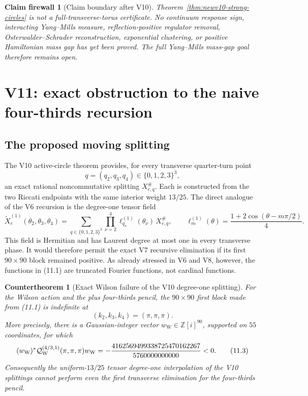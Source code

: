 \documentclass[11pt,oneside]{article}
\newtheorem{firewall}[theorem]{Claim firewall}
\newtheorem{countertheorem}[theorem]{Countertheorem}
\theoremstyle{definition}
\theoremstyle{remark}
\begin{document}
\begin{firewall}[Claim boundary after V10]
\label{fire:newv10-final}
Theorem~\ref{thm:newv10-strong-circles} is not a full-transverse-torus
certificate.  No continuum response sign, interacting Yang--Mills
measure, reflection-positive regulator removal, Osterwalder--Schrader
reconstruction, exponential clustering, or positive Hamiltonian
mass gap has yet been proved.  The full Yang--Mills mass-gap goal
therefore remains open.
\end{firewall}

\section{V11: exact obstruction to the naive four-thirds recursion}
\label{sec:newv11-obstruction}

\subsection{The proposed moving splitting}

The V10 active-circle theorem provides, for every transverse
quarter-turn point
\[
 q=(q_2,q_3,q_4)\in\{0,1,2,3\}^3,
\]
an exact rational noncommutative splitting \(X_{e,q}^{\#}\).  Each is
constructed from the two Riccati endpoints with the same interior
weight \(13/25\).  The direct analogue of the V6 recursion is the
degree-one tensor field
\[
 \widetilde X_e^{(1)}(\theta_2,\theta_3,\theta_4)
 =
 \sum_{q\in\{0,1,2,3\}^3}
 \prod_{\nu=2}^4
 \ell_{q_\nu}^{(1)}(\theta_\nu)\,X_{e,q}^{\#},
 \qquad
 \ell_m^{(1)}(\theta)
 =\frac{1+2\cos(\theta-m\pi/2)}4 .                        \tag{11.1}
\]
This field is Hermitian and has Laurent degree at most one in every
transverse phase.  It would therefore permit the exact V7 recursive
elimination if its first \(90\times90\) block remained positive.
As already stressed in V6 and V8, however, the functions in (11.1)
are truncated Fourier functions, not cardinal functions.

\begin{countertheorem}[Exact Wilson failure of the V10 degree-one splitting]
\label{ctr:newv11-degree-one}
For the Wilson action and the plus four-thirds pencil, the
\(90\times90\) first block made from (11.1) is indefinite at
\[
 (k_2,k_3,k_4)=(\pi,\pi,\pi).                             \tag{11.2}
\]
More precisely, there is a Gaussian-integer vector
\(w_{\mathrm W}\in\mathbb Z[i]^{90}\), supported on \(55\)
coordinates, for which
\[
 (w_{\mathrm W})^*
 {\cal Q}^{(4/3,1)}_{\mathrm W}(\pi,\pi,\pi)
 w_{\mathrm W}
 =
 -\frac{4162569499338725470162267}{5760000000000}<0.      \tag{11.3}
\]
Consequently the uniform-\(13/25\) tensor degree-one interpolation of
the V10 splittings cannot perform even the first transverse
elimination for the four-thirds pencil.
\end{countertheorem}
\end{document}
